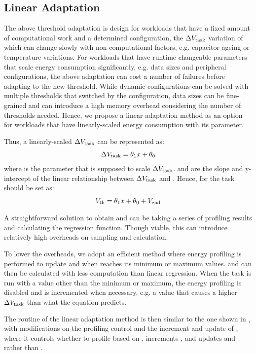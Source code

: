 \subsection{Linear Adaptation}

The above threshold adaptation is design for workloads that have a fixed amount of computational work and a determined configuration, the $\Delta V_{\text{task}}$ variation of which can change slowly with non-computational factors, e.g. capacitor ageing or temperature variations.
For workloads that have runtime changeable parameters that scale energy consumption significantly, e.g. data sizes and peripheral configurations, the above adaptation can cost a number of failures before adapting to the new threshold. 
While dynamic configurations can be solved with multiple thresholds that switched by the configuration, data sizes can be fine-grained and can introduce a high memory overhead considering the number of thresholds needed. 
Hence, we propose a linear adaptation method as an option for workloads that have linearly-scaled energy consumption with its parameter. 

Thus, a linearly-scaled $\Delta V_{\text{task}}$ can be represented as:
\begin{equation}
    \Delta V_{\text{task}} = \theta_{\text{1}} x + \theta_{\text{0}}
\end{equation}
where  is the parameter that is supposed to scale $\Delta V_{\text{task}}$.  and  are the slope and y-intercept of the linear relationship between $\Delta V_{\text{task}}$ and . Hence,  for the task should be set as:
\begin{equation}
    V_{\text{th}} = \theta_{\text{1}} x + \theta_{\text{0}} + V_{\text{end}}
\end{equation}

A straightforward solution to obtain  and  can be taking a series of profiling results and calculating the regression function.
Though viable, this can introduce relatively high overheads on sampling and calculation.

To lower the overheads, we adopt an efficient method where energy profiling is performed to update  and  when  reaches its minimum or maximum values. 
 and  can then be calculated with less computation than linear regression. 
When the task is run with a  value other than the minimum or maximum, the energy profiling is disabled and  is incremented when necessary, e.g. a  value that causes a higher $\Delta V_{\text{task}}$ than what the equation predicts. 

The routine of the linear adaptation method is then similar to the one shown in , with modifications on the profiling control and the increment and update of , where it controls whether to profile based on , increments , and updates  and  rather than . 

